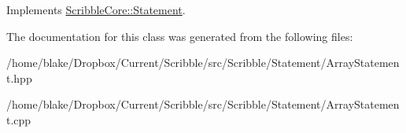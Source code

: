 Implements \hyperlink{class_scribble_core_1_1_statement}{Scribble\-Core\-::\-Statement}.



The documentation for this class was generated from the following files\-:\begin{DoxyCompactItemize}
\item 
/home/blake/\-Dropbox/\-Current/\-Scribble/src/\-Scribble/\-Statement/Array\-Statement.\-hpp\item 
/home/blake/\-Dropbox/\-Current/\-Scribble/src/\-Scribble/\-Statement/Array\-Statement.\-cpp\end{DoxyCompactItemize}
